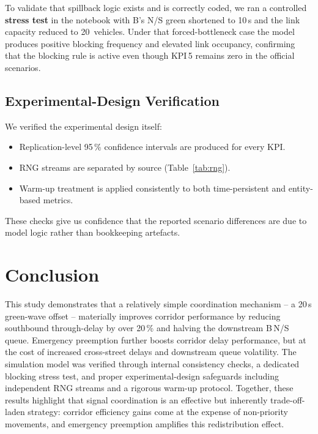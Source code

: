 \documentclass[11pt,a4paper]{article}
\begin{document}
To validate that spillback logic exists and is correctly coded, we ran a controlled \textbf{stress test} in the notebook with B's N/S green shortened to 10\,s and the link capacity reduced to 20~vehicles. Under that forced-bottleneck case the model produces positive blocking frequency and elevated link occupancy, confirming that the blocking rule is active even though KPI\,5 remains zero in the official scenarios.

\subsection{Experimental-Design Verification}

We verified the experimental design itself:
\begin{itemize}[leftmargin=1.2em,itemsep=3pt]
  \item Replication-level 95\,\% confidence intervals are produced for every KPI.
  \item RNG streams are separated by source (Table~\ref{tab:rng}).
  \item Warm-up treatment is applied consistently to both time-persistent and entity-based metrics.
\end{itemize}
These checks give us confidence that the reported scenario differences are due to model logic rather than bookkeeping artefacts.

\section{Conclusion}
\label{sec:conclusion}

This study demonstrates that a relatively simple coordination mechanism -- a 20\,s green-wave offset -- materially improves corridor performance by reducing southbound through-delay by over 20\,\% and halving the downstream B\,N/S queue. Emergency preemption further boosts corridor delay performance, but at the cost of increased cross-street delays and downstream queue volatility. The simulation model was verified through internal consistency checks, a dedicated blocking stress test, and proper experimental-design safeguards including independent RNG streams and a rigorous warm-up protocol. Together, these results highlight that signal coordination is an effective but inherently trade-off-laden strategy: corridor efficiency gains come at the expense of non-priority movements, and emergency preemption amplifies this redistribution effect.
\end{document}
